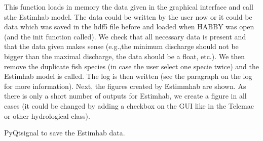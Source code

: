 \documentclass[letterpaper,10pt,english]{sphinxmanual}
\begin{document}
\begin{fulllineitems}
\begin{fulllineitems}
This function loads in memory the data given in the graphical interface and call sthe Estimhab model.
The data could be written by the user now or it could be data which was saved in the hdf5 file before and
loaded when HABBY was open (and the init function called).  We check that all necessary data is present and
that the data given makes sense (e.g.,the minimum discharge should not be bigger than the maximal discharge,
the data should be a float, etc.). We then remove the duplicate fish species (in case the user select one
specie twice) and the Estimhab model is called. The log is then written (see the paragraph on the log for more
information). Next, the figures created by Estimmhab are shown. As there is only a short number of outputs
for Estimhab, we create a figure in all cases (it could be changed by adding a checkbox on the GUI like
in the Telemac or other hydrological class).

\end{fulllineitems}


\begin{fulllineitems}
\label{\detokenize{index:src_GUI.estimhab_GUI.EstimhabW.save_signal_estimhab}}
PyQtsignal to save the Estimhab data.

\end{fulllineitems}


\end{fulllineitems}

\end{document}
